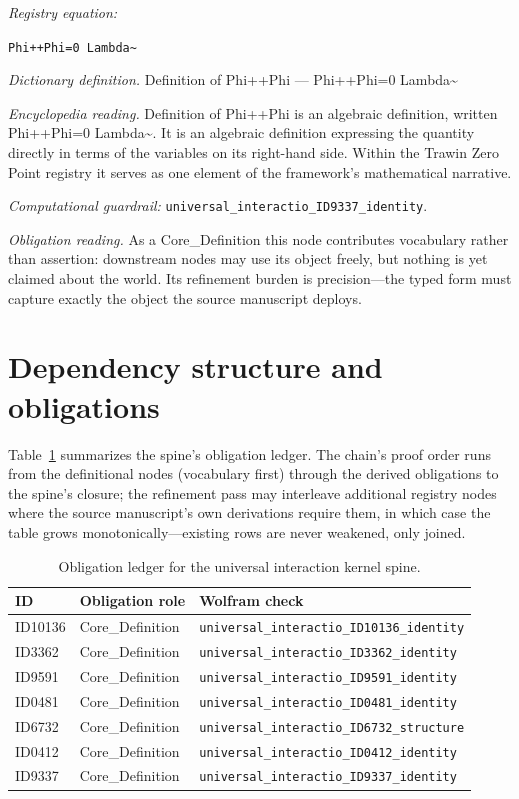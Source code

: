 \documentclass[11pt]{article}
\theoremstyle{remark}
\begin{document}
\noindent\textit{Registry equation:}\par
{\small\texttt{Phi++Phi=0 Lambda\textasciitilde{}}}\par\medskip
\noindent\textit{Dictionary definition.} Definition of Phi++Phi --- Phi++Phi=0 Lambda\textasciitilde{}\par\medskip
\noindent\textit{Encyclopedia reading.} Definition of Phi++Phi is an algebraic definition, written Phi++Phi=0 Lambda\textasciitilde{}. It is an algebraic definition expressing the quantity directly in terms of the variables on its right-hand side. Within the Trawin Zero Point registry it serves as one element of the framework's mathematical narrative.
\par\medskip\noindent\textit{Computational guardrail:} \texttt{universal\_interactio\_ID9337\_identity}.
\par\medskip\noindent\textit{Obligation reading.} As a Core\_Definition this node contributes vocabulary rather than assertion: downstream nodes may use its object freely, but nothing is yet claimed about the world. Its refinement burden is precision---the typed form must capture exactly the object the source manuscript deploys.

\section{Dependency structure and obligations}
\label{sec:dep}

Table~\ref{tab:obligations} summarizes the spine's obligation ledger. The chain's proof order runs from the definitional nodes (vocabulary first) through the derived obligations to the spine's closure; the refinement pass may interleave additional registry nodes where the source manuscript's own derivations require them, in which case the table grows monotonically---existing rows are never weakened, only joined.

\begin{table}[ht]
\centering
\small
\caption{Obligation ledger for the universal interaction kernel spine.}
\label{tab:obligations}
\begin{tabular}{llp{6.2cm}}
\toprule
ID & Obligation role & Wolfram check \\
\midrule
ID10136 & Core\_Definition & \texttt{universal\_interactio\_ID10136\_identity} \\
ID3362 & Core\_Definition & \texttt{universal\_interactio\_ID3362\_identity} \\
ID9591 & Core\_Definition & \texttt{universal\_interactio\_ID9591\_identity} \\
ID0481 & Core\_Definition & \texttt{universal\_interactio\_ID0481\_identity} \\
ID6732 & Core\_Definition & \texttt{universal\_interactio\_ID6732\_structure} \\
ID0412 & Core\_Definition & \texttt{universal\_interactio\_ID0412\_identity} \\
ID9337 & Core\_Definition & \texttt{universal\_interactio\_ID9337\_identity} \\
\bottomrule
\end{tabular}
\end{table}
\end{document}
